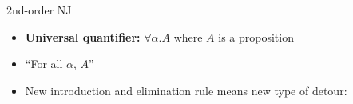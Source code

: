 \documentclass{beamer}
\begin{document}
\begin{frame}{2nd-order NJ}
    \begin{itemize}
        \item \textbf{Universal quantifier:} $\forall \alpha. A$ where $A$ is a proposition
        \item ``For all $\alpha$, $A$''
    \end{itemize}

    \begin{prooftree}
    \end{prooftree}
    
    \begin{prooftree}
    \end{prooftree}
    
    \begin{itemize}
        \item New introduction and elimination rule means new type of detour:
    \end{itemize}

    \begin{prooftree}
    \end{prooftree}
\end{frame}
\end{document}
